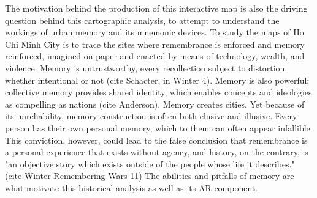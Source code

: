 The motivation behind the production of this interactive map is also the driving question behind this cartographic analysis, to  attempt to understand the workings of urban memory and its mnemonic devices. To study the maps of Ho Chi Minh City is to trace the sites where remembrance is enforced and memory reinforced, imagined on paper and enacted by means of technology,  wealth, and violence. Memory is untrustworthy, every recollection subject to distortion, whether intentional or not (cite Schacter, in Winter 4). Memory is also powerful; collective memory provides shared identity, which enables concepts and ideologies as compelling as nations (cite Anderson). Memory creates cities. Yet because of its unreliability, memory construction is often both elusive and illusive. Every person has their own personal memory, which to them can often appear infallible. This conviction, however, could lead to the false conclusion that remembrance is a personal experience that exists without agency, and history, on the contrary, is "an objective story which exists outside of the people whose life it describes." (cite Winter Remembering Wars 11) The abilities and pitfalls of memory are what motivate this historical analysis as well as its AR component.

